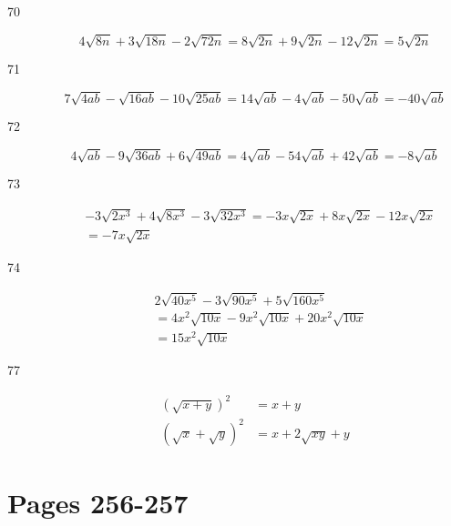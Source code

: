 \documentclass[fleqn,addpoints]{exam}
\begin{document}
\begin{description}

\item[70]
\[
  4\sqrt{8n} + 3\sqrt{18n} - 2\sqrt{72n} = 8\sqrt{2n} + 9\sqrt{2n} - 12\sqrt{2n} = 5\sqrt{2n}
\]

\item[71]
\[
  7\sqrt{4ab} - \sqrt{16ab} - 10\sqrt{25ab} = 14\sqrt{ab} - 4\sqrt{ab} - 50\sqrt{ab} = -40\sqrt{ab}
\]

\item[72]
\[
  4\sqrt{ab} - 9\sqrt{36ab} + 6\sqrt{49ab} = 4\sqrt{ab} - 54 \sqrt{ab} + 42\sqrt{ab} = -8\sqrt{ab}
\]

\item[73]
\begin{align*}
  & -3\sqrt{2x^3} + 4\sqrt{8x^3} - 3\sqrt{32x^3} = -3x\sqrt{2x} + 8x\sqrt{2x} - 12x\sqrt{2x} \\
  &= -7x\sqrt{2x}
\end{align*}

\item[74]
\begin{align*}
  & 2\sqrt{40x^5} - 3\sqrt{90x^5} + 5\sqrt{160x^5} \\
  &= 4x^2\sqrt{10x} - 9x^2\sqrt{10x} + 20x^2\sqrt{10x} \\
  &= 15x^2\sqrt{10x}
\end{align*}

\item[77]
\begin{align*}
  (\sqrt{x+y})^2 &= x + y \\
  (\sqrt{x} + \sqrt{y})^2 &= x + 2\sqrt{xy} + y
\end{align*}

\end{description}

\section{Pages 256-257}
\end{document}
